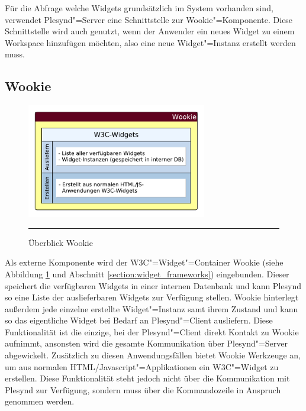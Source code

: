 Für die Abfrage welche Widgets grundsätzlich im System vorhanden sind, verwendet Plesynd"=Server eine Schnittstelle zur Wookie"=Komponente. Diese Schnittstelle wird auch genutzt, wenn der Anwender ein neues Widget zu einem Workspace hinzufügen möchten, also eine neue Widget"=Instanz erstellt werden muss.

\subsection{Wookie}\label{section:loesung_wookie}
\begin{figure}[ht]
  \centering
  \includegraphics[height=5cm,keepaspectratio]{./Figures/konzeptionelle_loesung_wookie.pdf}
    \rule{35em}{0.5pt}
  \caption[Überblick Wookie]{Überblick Wookie}
  \label{fig:ueberblick_wookie}
\end{figure}
Als externe Komponente wird der \ac{W3C}"=Widget"=Container Wookie (siehe Abbildung \ref{fig:ueberblick_wookie} und Abschnitt \ref{section:widget_frameworks}) eingebunden. Dieser speichert die verfügbaren Widgets in einer internen Datenbank und kann Plesynd so eine Liste der auslieferbaren Widgets zur Verfügung stellen. Wookie hinterlegt außerdem jede einzelne erstellte Widget"=Instanz samt ihrem Zustand und kann so das eigentliche Widget bei Bedarf an Plesynd"=Client ausliefern. Diese Funktionalität ist die einzige, bei der Plesynd"=Client direkt Kontakt zu Wookie aufnimmt, ansonsten wird die gesamte Kommunikation über Plesynd"=Server abgewickelt. Zusätzlich zu diesen Anwendungsfällen bietet Wookie Werkzeuge an, um aus normalen \ac{HTML}/Javascript"=Applikationen ein \ac{W3C}"=Widget zu erstellen. Diese Funktionalität steht jedoch nicht über die Kommunikation mit Plesynd zur Verfügung, sondern muss über die Kommandozeile in Anspruch genommen werden.

